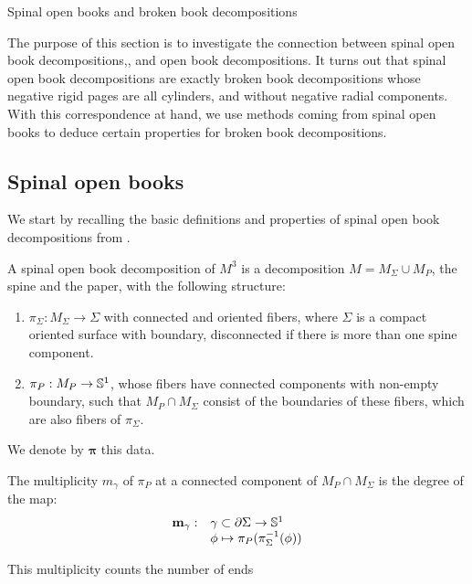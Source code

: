 \documentclass[../main.tex]{subfiles}
\begin{document}
\begin{section}{Spinal open books and broken book decompositions}\label{p:IV}

The purpose of this section is to investigate the connection between spinal open book decompositions\cite{SOBD1},\cite{SOBD2}, and open book decompositions. It turns out that spinal open book decompositions are exactly broken book decompositions whose negative rigid pages are all cylinders, and without negative radial components. With this correspondence at hand, we use methods coming from spinal open books to deduce certain properties for broken book decompositions.

\subsection{Spinal open books}

We start by recalling the basic definitions and properties of spinal open book decompositions from \cite{SOBD1}.

\begin{definition}
A spinal open book decomposition of $M^3$ is a decomposition $M = M_\Sigma\cup M_P$, the spine and the paper, with the following structure:
\begin{enumerate}
    \item  $\pi_\Sigma : M_\Sigma\rightarrow \Sigma$ with connected and oriented fibers, where $\Sigma$ is a compact oriented surface with boundary, disconnected if there is more than one spine component.
    \item $\pi_P : M_P\rightarrow \mathbb{S}^1$, whose fibers have connected components with non-empty boundary, such that $M_P\cap M_\Sigma$ consist of the boundaries of these fibers, which are also fibers of $\pi_\Sigma$.
\end{enumerate}
We denote by $\boldsymbol{\pi}$ this data.
\end{definition}

\begin{definition}\label{d:multiplicity_SOBD}
The multiplicity $m_\gamma$ of $\pi_P$ at a connected component of $M_P\cap M_\Sigma$ is the degree of the map:
\begin{equation*}
\begin{array}{ll}
\textbf{m}_\gamma : &\gamma\subset\partial\Sigma\rightarrow \mathbb{S}^1\\
&\phi \mapsto \pi_P(\pi_\Sigma^{-1}(\phi))
\end{array}
\end{equation*}
\end{definition}
This multiplicity counts the number of ends 


\end{section}
\end{document}
